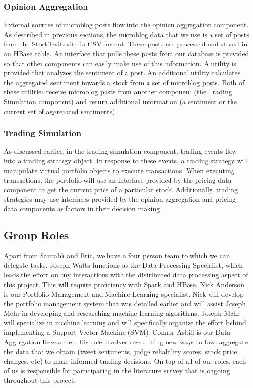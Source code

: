 \subsubsection{Opinion Aggregation}

External sources of microblog posts flow into the opinion aggregation component. As described in previous sections, the microblog data that we use is a set of posts from the StockTwits site in CSV format. These posts are processed and stored in an HBase table. An interface that pulls these posts from our database is provided so that other components can easily make use of this information. A utility is provided that analyzes the sentiment of a post. An additional utility calculates the aggregated sentiment towards a stock from a set of microblog posts. Both of these utilities receive microblog posts from another component (the Trading Simulation component) and return additional information (a sentiment or the current set of aggregated sentiments).

\subsubsection{Trading Simulation}

As discussed earlier, in the trading simulation component, trading events flow into a trading strategy object. In response to these events, a trading strategy will manipulate virtual portfolio objects to execute transactions. When executing transactions, the portfolio will use an interface provided by the pricing data component to get the current price of a particular stock. Additionally, trading strategies may use interfaces provided by the opinion aggregation and pricing data components as factors in their decision making.

\subsection{Group Roles}

Apart from Saurabh and Eric, we have a four person team to which we can delegate tasks. Joseph Watts functions as the Data Processing Specialist, which leads the effort on any interactions with the distributed data processing aspect of this project. This will require proficiency with Spark and HBase. Nick Anderson is our Portfolio Management and Machine Learning specialist. Nick will develop the portfolio management system that was detailed earlier and will assist Joseph Mehr in developing and researching machine learning algorithms. Joseph Mehr will specialize in machine learning and will specifically organize the effort behind implementing a Support Vector Machine (SVM). Connor Asbill is our Data Aggregation Researcher. His role involves researching new ways to best aggregate the data that we obtain (tweet sentiments, judge reliability scores, stock price changes, etc) to make informed trading decisions. On top of all of our roles, each of us is responsible for participating in the literature survey that is ongoing throughout this project.

